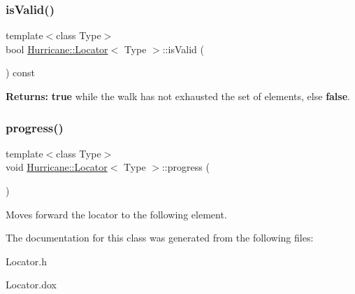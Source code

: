 \subsubsection{\texorpdfstring{is\+Valid()}{isValid()}}
{\footnotesize\ttfamily template$<$class Type$>$ \\
bool \mbox{\hyperlink{classHurricane_1_1Locator}{Hurricane\+::\+Locator}}$<$ Type $>$\+::is\+Valid (\begin{DoxyParamCaption}{ }\end{DoxyParamCaption}) const\hspace{0.3cm}{\ttfamily [pure virtual]}}

{\bfseries Returns\+:} {\bfseries true} while the walk has not exhausted the set of elements, else {\bfseries false}. \mbox{\label{classHurricane_1_1Locator_ad8d72c1625a343a50520792c96fa1ca1}} 
\subsubsection{\texorpdfstring{progress()}{progress()}}
{\footnotesize\ttfamily template$<$class Type$>$ \\
void \mbox{\hyperlink{classHurricane_1_1Locator}{Hurricane\+::\+Locator}}$<$ Type $>$\+::progress (\begin{DoxyParamCaption}{ }\end{DoxyParamCaption})\hspace{0.3cm}{\ttfamily [pure virtual]}}

Moves forward the locator to the following element. 

The documentation for this class was generated from the following files\+:\begin{DoxyCompactItemize}
\item 
Locator.\+h\item 
Locator.\+dox\end{DoxyCompactItemize}
